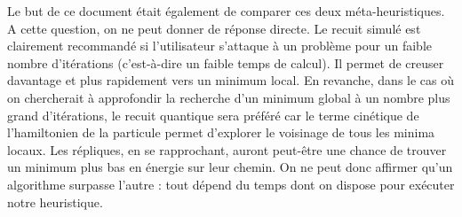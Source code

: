 \documentclass{article}%
\begin{document}
		\vspace{0.5cm}
		
		Le but de ce document était également de comparer ces deux méta-heuristiques. A cette question, on ne peut donner de réponse directe. Le recuit simulé est clairement recommandé si l'utilisateur s'attaque à un problème pour un faible nombre d'itérations (c'est-à-dire un faible temps de calcul). Il permet de creuser davantage et plus rapidement vers un minimum local. En revanche, dans le cas où on chercherait à approfondir la recherche d'un minimum global à un nombre plus grand d'itérations, le recuit quantique sera préféré car le terme cinétique de l'hamiltonien de la particule permet d'explorer le voisinage de tous les minima locaux. Les répliques, en se rapprochant, auront peut-être une chance de trouver un minimum plus bas en énergie sur leur chemin. On ne peut donc affirmer qu'un algorithme surpasse l'autre : tout dépend du temps dont on dispose pour exécuter notre heuristique.

\clearpage	
\listoffigures
\listofalgorithms

\end{document}
